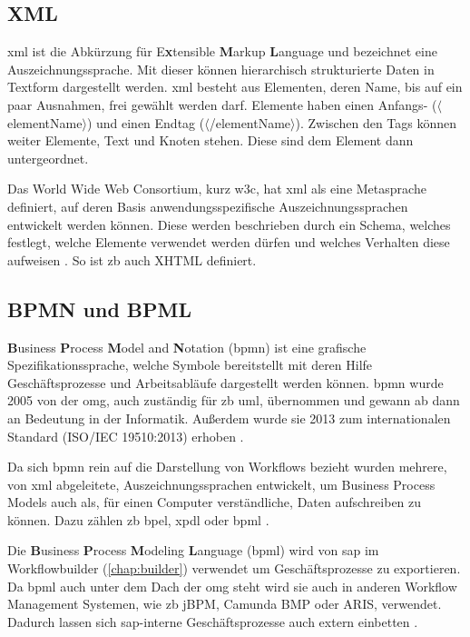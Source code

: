 \subsection{XML}
\label{sec:export-xml}

\gls{xml} ist die Abkürzung für E\textbf{x}tensible \textbf{M}arkup \textbf{L}anguage und bezeichnet eine Auszeichnungssprache. Mit dieser können hierarchisch strukturierte Daten in Textform dargestellt werden. \gls{xml} besteht aus Elementen, deren Name, bis auf ein paar Ausnahmen, frei gewählt werden darf. Elemente haben einen Anfangs- ($\langle$elementName$\rangle$) und einen Endtag ($\langle$/elementName$\rangle$). Zwischen den Tags können weiter Elemente, Text und Knoten stehen. Diese sind dem Element dann untergeordnet.

Das World Wide Web Consortium, kurz \gls{w3c}, hat \gls{xml} als eine Metasprache definiert, auf deren Basis anwendungsspezifische Auszeichnungssprachen entwickelt werden können. Diese werden beschrieben durch ein Schema, welches festlegt, welche Elemente verwendet werden dürfen und welches Verhalten diese aufweisen \cite{XML}. So ist \gls{zb} auch XHTML definiert.

\subsection{BPMN und BPML}
\label{sec:export-bpmn-bpml}

\textbf{B}usiness \textbf{P}rocess \textbf{M}odel and \textbf{N}otation (\gls{bpmn}) ist eine grafische Spezifikationssprache, welche Symbole bereitstellt mit deren Hilfe Geschäftsprozesse und Arbeitsabläufe dargestellt werden können.\cite{BPMN} \gls{bpmn} wurde 2005 von der \gls{omg}, auch zuständig für \gls{zb} \gls{uml}, übernommen und gewann ab dann an Bedeutung in der Informatik. Außerdem wurde sie 2013 zum internationalen Standard (ISO/IEC 19510:2013) erhoben \cite{OMG}.

Da sich \gls{bpmn} rein auf die Darstellung von Workflows bezieht wurden mehrere, von \gls{xml} abgeleitete, Auszeichnungssprachen entwickelt, um Business Process Models auch als, für einen Computer verständliche, Daten aufschreiben zu können. Dazu zählen \gls{zb} \gls{bpel}, \gls{xpdl} oder \gls{bpml} \cite{BPMN}.

Die \textbf{B}usiness \textbf{P}rocess \textbf{M}odeling \textbf{L}anguage (\gls{bpml}) wird von \gls{sap} im Workflowbuilder (\ref{chap:builder}) verwendet um Geschäftsprozesse zu exportieren. Da \gls{bpml} auch unter dem Dach der \gls{omg} steht wird sie auch in anderen Workflow Management Systemen, wie \gls{zb} jBPM, Camunda BMP oder ARIS, verwendet. Dadurch lassen sich \gls{sap}-interne Geschäftsprozesse auch extern einbetten \cite{BPML}.